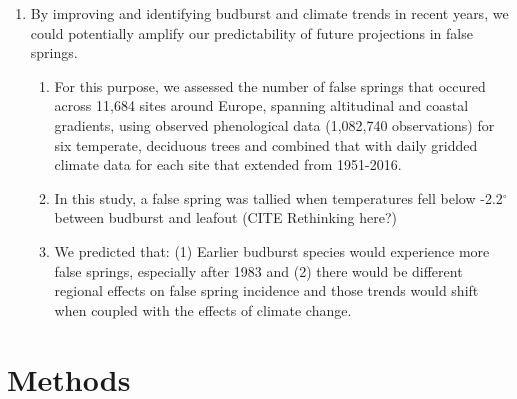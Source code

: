 \documentclass{article}\usepackage[]{graphicx}\usepackage[]{color}
\begin{document}
\begin{enumerate}
\item By improving and identifying budburst and climate trends in recent years, we could potentially amplify our predictability of future projections in false springs.
\begin{enumerate}
\item For this purpose, we assessed the number of false springs that occured across 11,684 sites around Europe, spanning altitudinal and coastal gradients, using observed phenological data (1,082,740 observations) for six temperate, deciduous trees and combined that with daily gridded climate data for each site that extended from 1951-2016. %
\item In this study, a false spring was tallied when temperatures fell below -2.2$^{\circ}$ \citep{Schwartz1993} between budburst and leafout (CITE Rethinking here?)
\item We predicted that: (1) Earlier budburst species would experience more false springs, especially after 1983 and (2) there would be different regional effects on false spring incidence and those trends would shift when coupled with the effects of climate change.
\end{enumerate}
\end{enumerate}

\section*{Methods}
\end{document}
